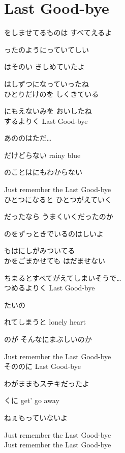 \section{ Last Good-bye}
\large{

をしませてるものは すべてえるよ

ったのようにっていてしい

はそのい きしめていたよ

はしずつになっていったね
\\

ひとりだけのを しくきている

にもえないみを おいしたね
\\

するよりく Last Good-bye

あののはただ…

だけどらない rainy blue

のことはにもわからない

Just remember the Last Good-bye
\\

ひとつになると ひとつがえていく

だったなら うまくいくだったのか

のをずっときでいるのはしいよ

もはにしがみついてる
\\

かをごまかせても はだませない

ちまるとすべてがえてしまいそうで…
\\

つめるよりく Last Good-bye

たいの

れてしまうと lonely heart

のが そんなにまぶしいのか

Just remember the Last Good-bye
\\

そののに Last Good-bye

わがままもステキだったよ

くに get' go away

ねぇもっていないよ

Just remember the Last Good-bye
\\

Just remember the Last Good-bye

}